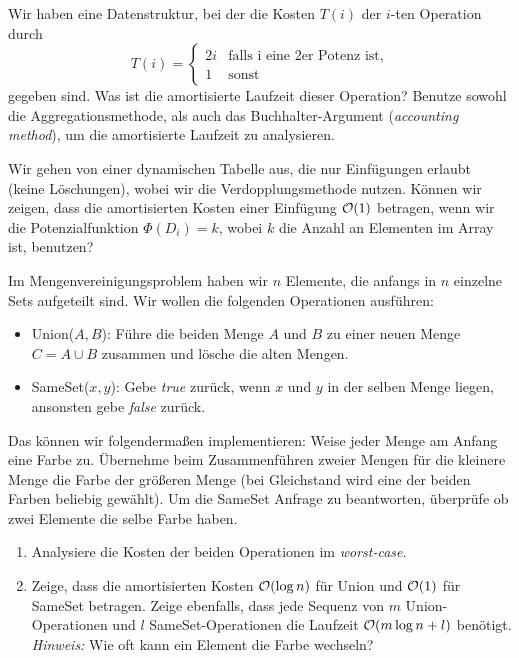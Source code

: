\documentclass{uebung_cs}
\begin{document}
\begin{aufgabe}
	Wir haben eine Datenstruktur, bei der die Kosten $T(i)$ der $i$-ten Operation durch 
	$$T(i) = \begin{cases} 2i & \text{falls i eine 2er Potenz ist}, \\ 1 & \text{sonst} \end{cases}$$ 
	gegeben sind.
	Was ist die amortisierte Laufzeit dieser Operation? Benutze sowohl die Aggregationsmethode, als auch das Buchhalter-Argument (\textit{accounting method}), um die amortisierte Laufzeit zu analysieren.
\end{aufgabe}    

\begin{aufgabe}
	Wir gehen von einer dynamischen Tabelle aus, die nur Einfügungen erlaubt (keine Löschungen), wobei wir die Verdopplungsmethode nutzen. Können wir zeigen, dass die amortisierten Kosten einer Einfügung $\mathcal{O}(1)$ betragen, wenn wir die Potenzialfunktion $\Phi(D_i) = k$, wobei $k$ die Anzahl an Elementen im Array ist, benutzen?
\end{aufgabe}

\begin{aufgabe}[Mengenvereinigung]
	Im Mengenvereinigungsproblem haben wir $n$ Elemente, die anfangs in $n$ einzelne Sets aufgeteilt sind. Wir wollen die folgenden Operationen ausführen:
	\begin{itemize}
		\item Union($A,B$): Führe die beiden Menge $A$ und $B$ zu einer neuen Menge $C = A \cup B$ zusammen und lösche die alten Mengen.\\
		\item SameSet($x,y$): Gebe \textit{true} zurück, wenn $x$ und $y$ in der selben Menge liegen, ansonsten gebe \textit{false} zurück.
	\end{itemize}
	Das können wir folgendermaßen implementieren: Weise jeder Menge am Anfang eine Farbe zu. Übernehme beim Zusammenführen zweier Mengen für die kleinere Menge die Farbe der größeren Menge (bei Gleichstand wird eine der beiden Farben beliebig gewählt). Um die SameSet Anfrage zu beantworten, überprüfe ob zwei Elemente die selbe Farbe haben.
	\begin{enumerate}
		\item Analysiere die Kosten der beiden Operationen im \textit{worst-case}.\\
		\item Zeige, dass die amortisierten Kosten $\mathcal{O}(\log n)$ für Union und $\mathcal{O}(1)$ für SameSet betragen. Zeige ebenfalls, dass jede Sequenz von $m$ Union-Operationen und $l$ SameSet-Operationen die Laufzeit $\mathcal{O}(m \log n + l)$ benötigt.\\
		\textit{Hinweis:} Wie oft kann ein Element die Farbe wechseln?
	\end{enumerate}
\end{aufgabe}
\end{document}
